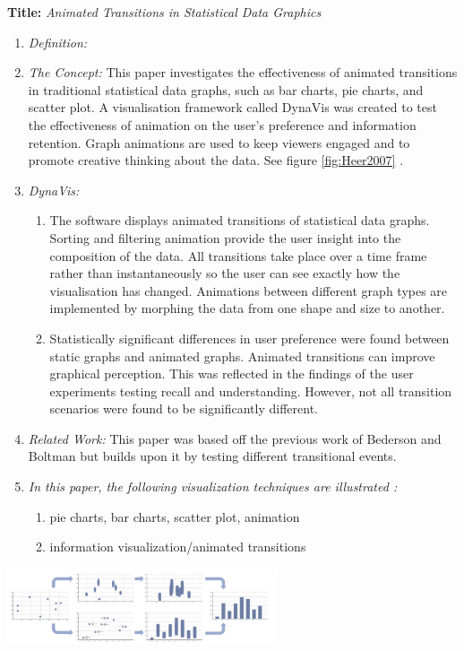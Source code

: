 \documentclass{egpubl}
\begin{document}
\textbf{Title:} \textit{Animated Transitions in Statistical Data Graphics}
\begin{enumerate}
\item \textit{Definition:} 
\item \textit{The Concept:} This paper investigates the effectiveness of animated transitions in traditional statistical data graphs, such as bar charts, pie charts, and scatter plot. A visualisation framework called DynaVis was created to test the effectiveness of animation on the user's preference and information retention. Graph animations are used to keep viewers engaged and to promote creative thinking about the data. See figure \ref{fig:Heer2007} \cite{heer2007}.
\item  \textit{DynaVis:} 
\begin{enumerate}
\item The software displays animated transitions of statistical data graphs. Sorting and filtering animation provide the user insight into the composition of the data. All transitions take place over a time frame rather than instantaneously so the user can see exactly how the visualisation has changed. Animations between different graph types are implemented by morphing the data from one shape and size to another.
\item Statistically significant differences in user preference were found between static graphs and animated graphs. Animated transitions can improve graphical perception. This was reflected in the findings of the user experiments testing recall and understanding. However, not all transition scenarios were found to be significantly different.
\end{enumerate}
\item \textit{Related Work:}  This paper was based off the previous work of Bederson and Boltman \cite{bedrson} but builds upon it by testing different transitional events.
\item \textit{In this paper, the following visualization techniques are illustrated :} 
\begin{enumerate}
\item pie charts, bar charts, scatter plot, animation
\item information visualization/animated transitions
\end{enumerate}
\end{enumerate}

\begingroup
\centering
\includegraphics[width=8cm]{./images/AnimatedTransitions}
\label{fig:Heer2007}
\endgroup
\end{document}
